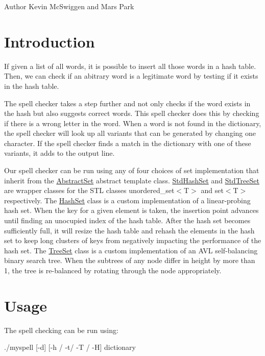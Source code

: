 \begin{DoxyAuthor}{Author}
Kevin Mc\-Swiggen and Mars Park
\end{DoxyAuthor}
\hypertarget{index_intro_sec}{}\section{Introduction}\label{index_intro_sec}
If given a list of all words, it is possible to insert all those words in a hash table. Then, we can check if an abitrary word is a legitimate word by testing if it exists in the hash table.

The spell checker takes a step further and not only checks if the word exists in the hash but also suggests correct words. This spell checker does this by checking if there is a wrong letter in the word. When a word is not found in the dictionary, the spell checker will look up all variants that can be generated by changing one character. If the spell checker finds a match in the dictionary with one of these variants, it adds to the output line.

Our spell checker can be run using any of four choices of set implementation that inherit from the \hyperlink{class_abstract_set}{Abstract\-Set} abstract template class. \hyperlink{class_std_hash_set}{Std\-Hash\-Set} and \hyperlink{class_std_tree_set}{Std\-Tree\-Set} are wrapper classes for the S\-T\-L classes unordered\-\_\-set$<$\-T$>$ and set$<$\-T$>$ respectively. The \hyperlink{class_hash_set}{Hash\-Set} class is a custom implementation of a linear-\/probing hash set. When the key for a given element is taken, the insertion point advances until finding an unocupied index of the hash table. After the hash set becomes sufficiently full, it will resize the hash table and rehash the elements in the hash set to keep long clusters of keys from negatively impacting the performance of the hash set. The \hyperlink{class_tree_set}{Tree\-Set} class is a custom implementation of an A\-V\-L self-\/balancing binary search tree. When the subtrees of any node differ in height by more than 1, the tree is re-\/balanced by rotating through the node appropriately.\hypertarget{index_use_sec}{}\section{Usage}\label{index_use_sec}
The spell checking can be run using\-: \begin{DoxyVerb}./myspell [-d] [-h / -t/ -T / -H] dictionary
\end{DoxyVerb}


